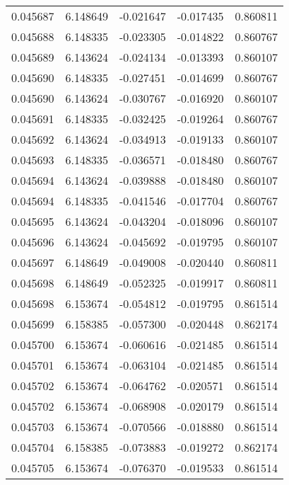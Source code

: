 \begin{tabular}{lrrrr}
0.045687    &  6.148649 & -0.021647 & -0.017435 &             0.860811 \\
0.045688    &  6.148335 & -0.023305 & -0.014822 &             0.860767 \\
0.045689    &  6.143624 & -0.024134 & -0.013393 &             0.860107 \\
0.045690    &  6.148335 & -0.027451 & -0.014699 &             0.860767 \\
0.045690    &  6.143624 & -0.030767 & -0.016920 &             0.860107 \\
0.045691    &  6.148335 & -0.032425 & -0.019264 &             0.860767 \\
0.045692    &  6.143624 & -0.034913 & -0.019133 &             0.860107 \\
0.045693    &  6.148335 & -0.036571 & -0.018480 &             0.860767 \\
0.045694    &  6.143624 & -0.039888 & -0.018480 &             0.860107 \\
0.045694    &  6.148335 & -0.041546 & -0.017704 &             0.860767 \\
0.045695    &  6.143624 & -0.043204 & -0.018096 &             0.860107 \\
0.045696    &  6.143624 & -0.045692 & -0.019795 &             0.860107 \\
0.045697    &  6.148649 & -0.049008 & -0.020440 &             0.860811 \\
0.045698    &  6.148649 & -0.052325 & -0.019917 &             0.860811 \\
0.045698    &  6.153674 & -0.054812 & -0.019795 &             0.861514 \\
0.045699    &  6.158385 & -0.057300 & -0.020448 &             0.862174 \\
0.045700    &  6.153674 & -0.060616 & -0.021485 &             0.861514 \\
0.045701    &  6.153674 & -0.063104 & -0.021485 &             0.861514 \\
0.045702    &  6.153674 & -0.064762 & -0.020571 &             0.861514 \\
0.045702    &  6.153674 & -0.068908 & -0.020179 &             0.861514 \\
0.045703    &  6.153674 & -0.070566 & -0.018880 &             0.861514 \\
0.045704    &  6.158385 & -0.073883 & -0.019272 &             0.862174 \\
0.045705    &  6.153674 & -0.076370 & -0.019533 &             0.861514 \\

\end{tabular}
